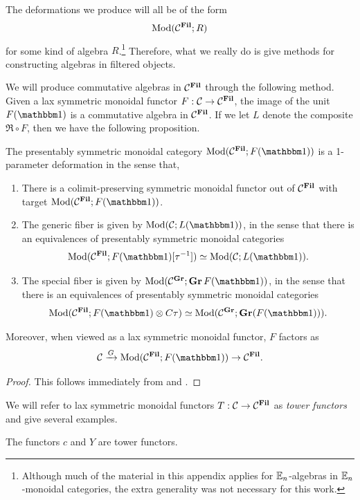The deformations we produce will all be of the form
\[ \mathrm{Mod} ( \mathcal{C}^{\operatorname{\mathbf{Fil}}} ; R ) \]
for some kind of algebra $R$.\footnote{Although much of the material in this appendix applies for $\mathbb{E}_n$-algebras in $\mathbb{E}_n$-monoidal categories, the extra generality was not necessary for this work.}
Therefore, what we really do is give methods for constructing algebras in filtered objects.



We will produce commutative algebras in $\mathcal{C}^{\operatorname{\mathbf{Fil}}}$ through the following method.
Given a lax symmetric monoidal functor $F : \mathcal{C} \to \mathcal{C}^{\operatorname{\mathbf{Fil}}}$, the image of the unit $F(\o)$ is a commutative algebra in $\mathcal{C}^{\operatorname{\mathbf{Fil}}}$. If we let $L$ denote the composite $\Re \circ F$, then we have the following proposition.

\begin{prop}
  The presentably symmetric monoidal category $\Mod(\CC^{\Fil}; F(\o))$ is a 1-parameter deformation in the sense that,
  \begin{enumerate}
  \item There is a colimit-preserving symmetric monoidal functor out of $\mathcal{C}^{\operatorname{\mathbf{Fil}}}$ with target $\Mod(\CC^{\Fil}; F(\o))$.
  \item The generic fiber is given by $\Mod(\CC; L(\o))$, in the sense that
    there is an equivalences of presentably symmetric monoidal categories
    \[\Mod(\CC^{\Fil}; F(\o)[\tau^{-1}]) \simeq \Mod(\CC; L(\o)). \]
  \item The special fiber is given by $\Mod(\CC^{\Gr}; \Gr F(\o) )$, in the sense that
    there is an equivalences of presentably symmetric monoidal categories
    \[\Mod(\CC^{\Fil}; F(\o) \otimes C\tau) \simeq \Mod(\CC^{\Gr}; \Gr(F(\o))).\]
  \end{enumerate}
  Moreover, when viewed as a lax symmetric monoidal functor, $F$ factors as
  \[ \CC \xrightarrow{G} \Mod(\CC^{\Fil}; F(\o)) \to \CC^{\Fil}. \]
\end{prop}

\begin{proof}
  This follows immediately from  and . 
\end{proof}

We will refer to lax symmetric monoidal functors $T : \mathcal{C} \to \mathcal{C}^{\operatorname{\mathbf{Fil}}}$ as \emph{tower functors} and give several examples.

\begin{exm}
  The functors $c$ and $Y$ are tower functors.
\end{exm}

